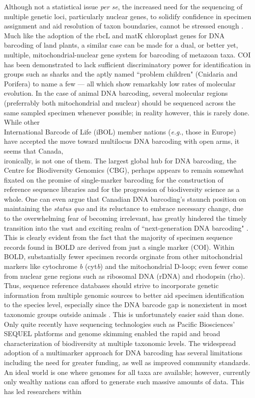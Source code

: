 Although not a statistical issue \textit{per se}, the increased need for the sequencing of multiple genetic loci, particularly nuclear genes, to solidify confidence in specimen assignment and aid resolution of taxon boundaries, cannot be stressed enough \cite{eberle2020plea}. Much like the adoption of the rbcL and matK chloroplast genes for DNA barcoding of land plants, a similar case can be made for a dual, or better yet, multiple, mitochondrial-nuclear gene system for barcoding of metazoan taxa. COI has been demonstrated to lack sufficient discriminatory power for identification in groups such as sharks and the aptly named ``problem children" (Cnidaria and Porifera) \cite{bucklin2011dna} to name a few --- all which show remarkably low rates of molecular evolution. In the case of animal DNA barcoding, several molecular regions (preferrably both mitochondrial and nuclear) should be sequenced across the same sampled specimen whenever possible; in reality however, this is rarely done. While other \\ International Barcode of Life (iBOL) member nations (\textit{e.g.}, those in Europe) have accepted the move toward multilocus DNA barcoding with open arms, it seems that Canada, \\ ironically, is not one of them. The largest global hub for DNA barcoding, the Centre for Biodiversity Genomics (CBG), perhaps appears to remain somewhat fixated on the promise of single-marker barcoding for the construction of reference sequence libraries and for the progression of biodiversity science as a whole. One can even argue that Canadian DNA barcoding's staunch position on maintaining the \textit{status quo} and its reluctance to embrace necessary change, due to the overwhelming fear of becoming irrelevant, has greatly hindered the timely transition into the vast and exciting realm of ``next-generation DNA barcoding" \cite{taylor2012emergent}. This is clearly evident from the fact that the majority of specimen sequence records found in BOLD are derived from just a single marker (COI). Within BOLD, substantially fewer specimen records orginate from other mitochondrial markers like cytochrome \textit{b} (cyt\textit{b}) and the mitochondrial D-loop; even fewer come from nuclear gene regions such as ribosomal DNA (rDNA) and rhodopsin (rho). Thus, sequence reference databases should strive to incorporate genetic information from multiple genomic sources to better aid specimen identification to the species level, especially since the DNA barcode gap is nonexistent in most taxonomic groups outside animals \cite{kolter2020plant}. This is unfortunately easier said than done. Only quite recently have sequencing technologies such as Pacific Biosciences' SEQUEL platforms and genome skimming \cite{coissac2016barcodes} enabled the rapid and broad \\ characterization of biodiversity at multiple taxonomic levels. The widespread adoption of a multimarker approach for DNA barcoding has several limitations including the need for greater funding, as well as improved community standards. An ideal world is one where genomes for all taxa are available; however, currently only wealthy nations can afford to generate such massive amounts of data. This has led researchers within 